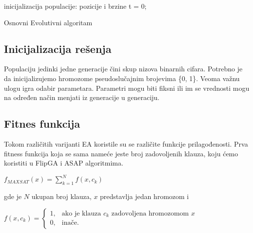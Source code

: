 \documentclass{article}
\begin{document}
\begin{algorithm}[H]
\SetAlgoLined
{}

\BlankLine
 inicijalizacija populacije: pozicije i brzine\;
 t = 0; \\
\caption{Osnovni Evolutivni algoritam}
\end{algorithm}

\subsection{Inicijalizacija rešenja}
\label{sec:ea_init}

Populaciju jedinki jedne generacije čini skup nizova binarnih cifara.
Potrebno je da inicijalizujemo hromozome pseudoslučajnim brojevima \{0, 1\}. Veoma važnu ulogu igra odabir parametara.  Parametri mogu biti fiksni ili im se vrednosti mogu na određen način menjati iz generacije u generaciju.

\subsection{Fitnes funkcija}
\label{sec:ea_fitness}

Tokom različitih varijanti EA koristile su se različite funkcije prilagođenosti. Prva fitness funkcija koja se sama nameće jeste broj zadovoljenih klauza, koju ćemo koristiti u FlipGA i ASAP algoritmima. \\

	\begin{center}
	$ f_{MAXSAT} (x) = \sum_{k=1}^{N} f(x, c_k) $
	\end{center} 
	
gde je $N$ ukupan broj klauza, $x$ predstavlja jedan hromozom i \\

	\begin{center}
	$ f(x, c_k) = \begin{cases} 1, & \mbox{ako je klauza } c_k \mbox{ zadovoljena hromozomom } x \\ 0, & \mbox{inače.} \end{cases} $
	\end{center}
	
\end{document}

